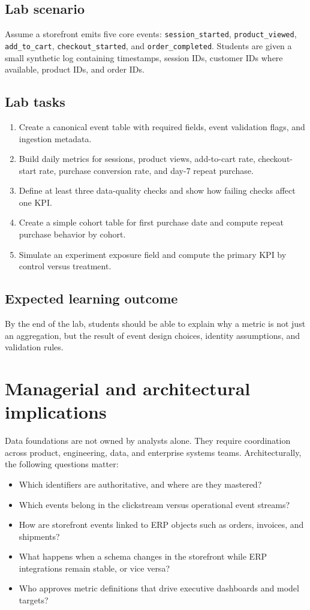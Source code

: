 \subsection{Lab scenario}
Assume a storefront emits five core events:
\texttt{session\_started}, \texttt{product\_viewed}, \texttt{add\_to\_cart}, \texttt{checkout\_started}, and \texttt{order\_completed}.
Students are given a small synthetic log containing timestamps, session IDs, customer IDs where available, product IDs, and order IDs.

\subsection{Lab tasks}
\begin{enumerate}
  \item Create a canonical event table with required fields, event validation flags, and ingestion metadata.
  \item Build daily metrics for sessions, product views, add-to-cart rate, checkout-start rate, purchase conversion rate, and day-7 repeat purchase.
  \item Define at least three data-quality checks and show how failing checks affect one KPI.
  \item Create a simple cohort table for first purchase date and compute repeat purchase behavior by cohort.
  \item Simulate an experiment exposure field and compute the primary KPI by control versus treatment.
\end{enumerate}

\subsection{Expected learning outcome}
By the end of the lab, students should be able to explain why a metric is not just an aggregation, but the result of event design choices, identity assumptions, and validation rules.

\section{Managerial and architectural implications}
Data foundations are not owned by analysts alone.
They require coordination across product, engineering, data, and enterprise systems teams.
Architecturally, the following questions matter:
\begin{itemize}
  \item Which identifiers are authoritative, and where are they mastered?
  \item Which events belong in the clickstream versus operational event streams?
  \item How are storefront events linked to ERP objects such as orders, invoices, and shipments?
  \item What happens when a schema changes in the storefront while ERP integrations remain stable, or vice versa?
  \item Who approves metric definitions that drive executive dashboards and model targets?
\end{itemize}

